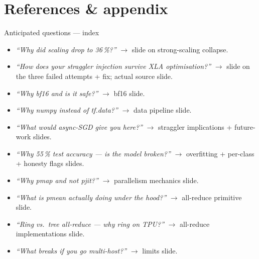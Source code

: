 \documentclass[aspectratio=169,10pt]{beamer}
\begin{document}
\section*{References \& appendix}

\begin{frame}{Anticipated questions — index}
  \small
  \begin{itemize}
    \item \emph{``Why did scaling drop to 36\,\%?''} $\to$ slide on strong-scaling collapse.
    \item \emph{``How does your straggler injection survive XLA optimisation?''} $\to$
          slide on the three failed attempts + fix; actual source slide.
    \item \emph{``Why bf16 and is it safe?''} $\to$ bf16 slide.
    \item \emph{``Why numpy instead of tf.data?''} $\to$ data pipeline slide.
    \item \emph{``What would async-SGD give you here?''} $\to$ straggler implications
          + future-work slides.
    \item \emph{``Why 55\,\% test accuracy — is the model broken?''} $\to$ overfitting
          + per-class + honesty flags slides.
    \item \emph{``Why pmap and not pjit?''} $\to$ parallelism mechanics slide.
    \item \emph{``What is pmean actually doing under the hood?''} $\to$
          all-reduce primitive slide.
    \item \emph{``Ring vs.\ tree all-reduce — why ring on TPU?''} $\to$
          all-reduce implementations slide.
    \item \emph{``What breaks if you go multi-host?''} $\to$ limits slide.
  \end{itemize}
\end{frame}
\end{document}
